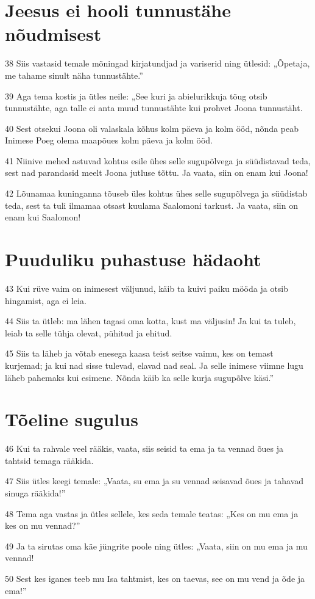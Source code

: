 \section*{Jeesus ei hooli tunnustähe nõudmisest}

\par 38 Siis vastasid temale mõningad kirjatundjad ja variserid ning ütlesid: „Õpetaja, me tahame sinult näha tunnustähte.”
\par 39 Aga tema kostis ja ütles neile: „See kuri ja abielurikkuja tõug otsib tunnustähte, aga talle ei anta muud tunnustähte kui prohvet Joona tunnustäht.
\par 40 Sest otsekui Joona oli valaskala kõhus kolm päeva ja kolm ööd, nõnda peab Inimese Poeg olema maapõues kolm päeva ja kolm ööd.
\par 41 Niinive mehed astuvad kohtus esile ühes selle sugupõlvega ja süüdistavad teda, sest nad parandasid meelt Joona jutluse tõttu. Ja vaata, siin on enam kui Joona!
\par 42 Lõunamaa kuninganna tõuseb üles kohtus ühes selle sugupõlvega ja süüdistab teda, sest ta tuli ilmamaa otsast kuulama Saalomoni tarkust. Ja vaata, siin on enam kui Saalomon!

\section*{Puuduliku puhastuse hädaoht}

\par 43 Kui rüve vaim on inimesest väljunud, käib ta kuivi paiku mööda ja otsib hingamist, aga ei leia.
\par 44 Siis ta ütleb: ma lähen tagasi oma kotta, kust ma väljusin! Ja kui ta tuleb, leiab ta selle tühja olevat, pühitud ja ehitud.
\par 45 Siis ta läheb ja võtab enesega kaasa teist seitse vaimu, kes on temast kurjemad; ja kui nad sisse tulevad, elavad nad seal. Ja selle inimese viimne lugu läheb pahemaks kui esimene. Nõnda käib ka selle kurja sugupõlve käsi.”

\section*{Tõeline sugulus}

\par 46 Kui ta rahvale veel rääkis, vaata, siis seisid ta ema ja ta vennad õues ja tahtsid temaga rääkida.
\par 47 Siis ütles keegi temale: „Vaata, su ema ja su vennad seisavad õues ja tahavad sinuga rääkida!”
\par 48 Tema aga vastas ja ütles sellele, kes seda temale teatas: „Kes on mu ema ja kes on mu vennad?”
\par 49 Ja ta sirutas oma käe jüngrite poole ning ütles: „Vaata, siin on mu ema ja mu vennad!
\par 50 Sest kes iganes teeb mu Isa tahtmist, kes on taevas, see on mu vend ja õde ja ema!”


